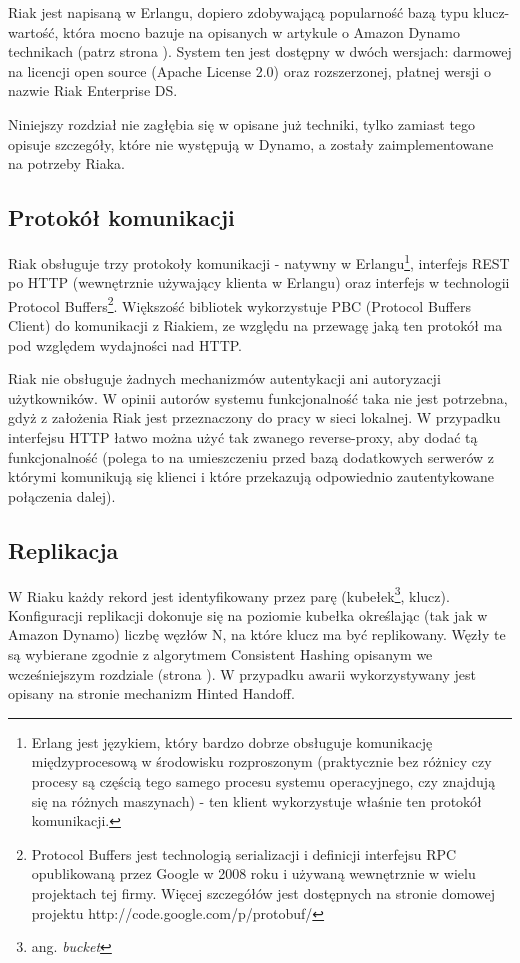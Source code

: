 Riak jest napisaną w Erlangu, dopiero zdobywającą popularność bazą typu klucz-wartość, która mocno bazuje na opisanych w artykule o Amazon Dynamo technikach (patrz strona \pageref{sec:dynamo-techniki}).
System ten jest dostępny w dwóch wersjach: darmowej na licencji open source (Apache License 2.0) oraz rozszerzonej, płatnej wersji o nazwie Riak Enterprise DS.

Niniejszy rozdział nie zagłębia się w opisane już techniki, tylko zamiast tego opisuje szczegóły, które nie występują w Dynamo, a zostały zaimplementowane na potrzeby Riaka.

\subsection*{Protokół komunikacji}

Riak obsługuje trzy protokoły komunikacji - natywny w Erlangu\footnote{Erlang jest językiem, który bardzo dobrze obsługuje komunikację międzyprocesową w środowisku rozproszonym (praktycznie bez różnicy czy procesy są częścią tego samego procesu systemu operacyjnego, czy znajdują się na różnych maszynach) - ten klient wykorzystuje właśnie ten protokół komunikacji.}, interfejs REST po HTTP (wewnętrznie używający klienta w Erlangu) oraz interfejs w technologii Protocol Buffers\footnote{Protocol Buffers jest technologią serializacji i definicji interfejsu RPC opublikowaną przez Google w 2008 roku i używaną wewnętrznie w wielu projektach tej firmy. Więcej szczegółów jest dostępnych na stronie domowej projektu http://code.google.com/p/protobuf/}.
Większość bibliotek wykorzystuje PBC (Protocol Buffers Client) do komunikacji z Riakiem, ze względu na przewagę jaką ten protokół ma pod względem wydajności nad HTTP.

Riak nie obsługuje żadnych mechanizmów autentykacji ani autoryzacji użytkowników.
W opinii autorów systemu funkcjonalność taka nie jest potrzebna, gdyż z założenia Riak jest przeznaczony do pracy w sieci lokalnej.
W przypadku interfejsu HTTP łatwo można użyć tak zwanego reverse-proxy, aby dodać tą funkcjonalność (polega to na umieszczeniu przed bazą dodatkowych serwerów z którymi komunikują się klienci i które przekazują odpowiednio zautentykowane połączenia dalej).

\subsection*{Replikacja}

W Riaku każdy rekord jest identyfikowany przez parę (kubełek\footnote{ang. \emph{bucket}}, klucz).
Konfiguracji replikacji dokonuje się na poziomie kubełka określając (tak jak w Amazon Dynamo) liczbę węzłów N, na które klucz ma być replikowany.
Węzły te są wybierane zgodnie z algorytmem Consistent Hashing opisanym we wcześniejszym rozdziale (strona \pageref{sec:dynamo-consistent-hashing}).
W przypadku awarii wykorzystywany jest opisany na stronie \pageref{sec:dynamo-hinted-handoff} mechanizm Hinted Handoff.

